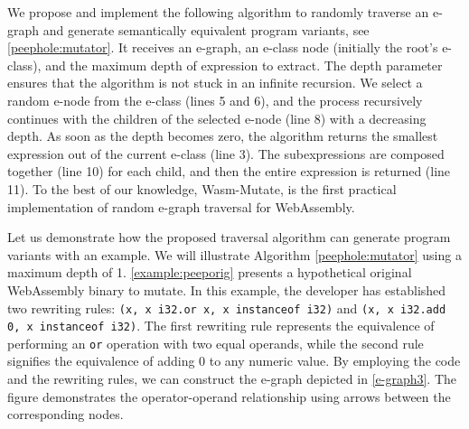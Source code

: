 \documentclass[a4paper,fleqn]{cas-dc}
\newcommand*\badge[1]{ \colorbox{red}{\color{white}#1}}
\newcommand{\tool}{{\sc Wasm-Mutate}\xspace}
\newcommand{\Wasm}{WebAssembly\xspace}
\newcommand{\todo}[1]{%
\refstepcounter{todo}
\noindent\textbf{\badge{TODO}} {\color{red}#1}
\addcontentsline{td}{todo}
{\color{red}\thesection.\thetodo\xspace #1}}
\begin{document}
We propose and implement the following algorithm to randomly traverse an e-graph and generate  semantically equivalent program variants, see \autoref{peephole:mutator}.
It receives an e-graph, an e-class node (initially the root's e-class), and the maximum depth of expression to extract. The depth parameter ensures that the algorithm is not stuck in an infinite recursion. We select a random e-node from the e-class (lines 5 and 6), and the process recursively continues with the children of the selected e-node (line 8) with a decreasing depth. As soon as the depth becomes zero, the algorithm returns the smallest expression out of the current e-class (line 3). The subexpressions are composed together (line 10) for each child, and then the entire expression is returned (line 11). 
To the best of our knowledge, \tool, is the first practical implementation of random e-graph traversal for \Wasm.


Let us demonstrate how the proposed traversal algorithm can generate program variants with an example. 
We will illustrate Algorithm \ref{peephole:mutator} using a maximum depth of 1. 
\autoref{example:peeporig} presents a hypothetical original WebAssembly binary to mutate. 
In this example, the developer has established two rewriting rules: \texttt{(x, x i32.or x, x instanceof i32)} and \texttt{(x, x i32.add 0, x instanceof i32)}. The first rewriting rule represents the equivalence of performing an \texttt{or} operation with two equal operands, while the second rule signifies the equivalence of adding 0 to any numeric value.
By employing the code and the rewriting rules, we can construct the e-graph depicted in \autoref{e-graph3}. The figure demonstrates the operator-operand relationship using arrows between the corresponding nodes.



\end{document}
